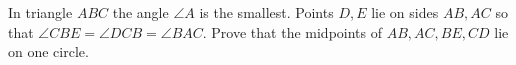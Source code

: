In triangle $ABC$ the angle $\angle A$ is the smallest. Points $D, E$ lie on sides $AB, AC$ so that $\angle CBE=\angle DCB=\angle BAC$. Prove that the midpoints of $AB, AC, BE, CD$ lie on one circle.